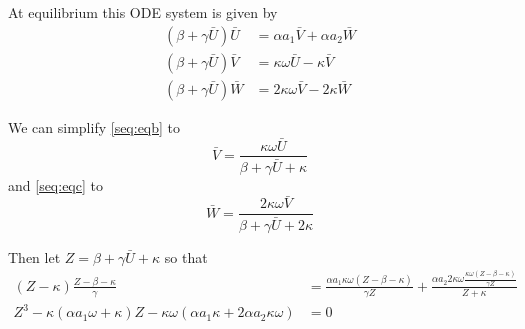 \documentclass{article}
\begin{document}
At equilibrium this ODE system is given by
\begin{subequations}
  \label{eq:eq}
  \begin{align}
  (\beta+\gamma \bar{U}) \bar{U} &= \alpha a_1 \bar{V} + \alpha a_2 \bar{W}\label{seq:eqa}\\
  (\beta + \gamma \bar{U})\bar{V}  &=  \kappa \omega \bar{U} - \kappa \bar{V}\label{seq:eqb}\\
  (\beta+\gamma \bar{U})\bar{W}  &=  2\kappa\omega \bar{V} - 2\kappa \bar{W}\label{seq:eqc}
  \end{align}
\end{subequations}

We can simplify \ref{seq:eqb} to
\begin{equation}
  \bar{V} = \frac{\kappa \omega \bar{U} }{\beta + \gamma \bar{U} + \kappa}\label{eq:6}
\end{equation}
and \ref{seq:eqc} to 
\begin{equation}
  \bar{W} = \frac{2\kappa\omega\bar{V}}{\beta + \gamma\bar{U} + 2\kappa}\label{eq:7}
\end{equation}

Then let $Z=\beta + \gamma\bar{U}+\kappa$ so that
\begin{equation}\label{eqn:Z}
  \begin{split}
   (Z-\kappa) \frac{Z-\beta-\kappa}{\gamma} &= \frac{\alpha a_1 \kappa\omega (Z-\beta-\kappa)}{\gamma Z} + \frac{\alpha a_2 2 \kappa\omega \frac{\kappa\omega(Z-\beta-\kappa)}{\gamma Z}}{Z+\kappa}\\   
    Z^3 - \kappa(\alpha a_1 \omega+\kappa)Z - \kappa\omega (\alpha a_1 \kappa + 2 \alpha a_2 \kappa\omega) &= 0
  \end{split}
\end{equation}
\end{document}
